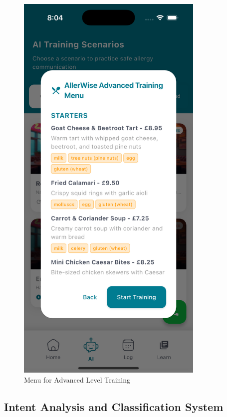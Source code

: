 \documentclass[MScCS]{uccthesis}
\begin{document}
\begin{figure}[htbp]
    \centering
    \includegraphics[width=0.8\textwidth,height=0.45\textheight,keepaspectratio]{Figures/menu.png}
    \caption{Menu for Advanced Level Training}
    \label{fig:menu}
\end{figure}

\subsection{Intent Analysis and Classification System}
\end{document}
